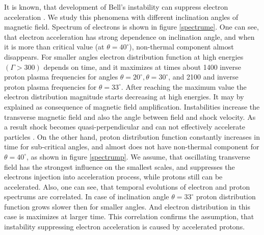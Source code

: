 \documentclass[a4paper]{jpconf}
\begin{document}
	It is known, that development of Bell's instability can suppress electron acceleration \cite{Crumley2019,2021MNRAS.501.4837L,2021MNRAS.502.5065L}. We study this phenomena with different inclination angles of magnetic field. Spectrum of electrons is shown in figure \ref{spectrume}. One can see, that electron acceleration has strong dependence on inclination angle, and when it is more than critical value (at $\theta = 40^\circ$), non-thermal component almost disappears. For smaller angles electron distribution function at high energies $(\Gamma > 300)$ depends on time, and it maximizes at times about 1400 inverse proton plasma frequencies for angles $\theta=20^\circ, \theta=30^\circ$, and 2100 and inverse proton plasma frequencies for $\theta = 33^\circ$. After reaching the maximum value the electron distribution magnitude starts decreasing at high energies. It may by explained as consequence of magnetic field amplification. Instabilities increase the transverse magnetic field and also the angle between field and shock velocity. As a result shock becomes quasi-perpendicular and can not effectively accelerate particles \cite{Sironi2011,Romansky18}. On the other hand, proton distribution function constantly increases in time for sub-critical angles, and almost does not have non-thermal component for $\theta = 40^\circ$, as shown in figure \ref{spectrump}. We assume, that oscillating transverse field has the strongest influence on the smallest scales, and suppresses the electrons injection into acceleration process, while protons still can be accelerated. Also, one can see, that temporal evolutions of electron and proton spectrums are correlated. In case of inclination angle $\theta = 33^\circ$ proton distribution function grows slower then for smaller angles. And electron distribution in this case is maximizes at larger time. This correlation confirms the assumption, that instability suppressing electron acceleration is caused by accelerated protons.
	
\end{document}
